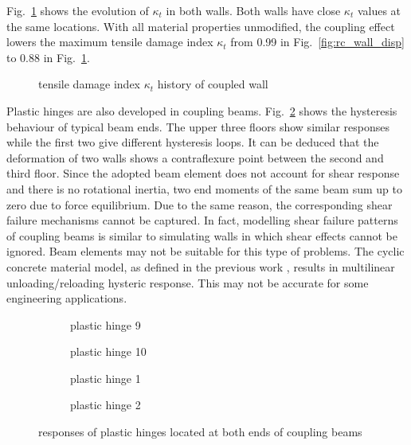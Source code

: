 \documentclass[3p,sort&compress,review,11pt,fleqn]{elsarticle}
\newcommand*{\figref}[1]{Fig.~\ref{#1}}
\begin{document}
\figref{fig:coupled_wall_kappat} shows the evolution of $\kappa_t$ in both walls. Both walls have close $\kappa_t$ values at the same locations. With all material properties unmodified, the coupling effect lowers the maximum tensile damage index $\kappa_t$ from \num{0.99} in \figref{fig:rc_wall_disp} to \num{0.88} in \figref{fig:coupled_wall_kappat}.
\begin{figure}[htb]
\centering\scriptsize

\caption{tensile damage index $\kappa_t$ history of coupled wall}\label{fig:coupled_wall_kappat}
\end{figure}

Plastic hinges are also developed in coupling beams. \figref{fig:coupled_wall_ph} shows the hysteresis behaviour of typical beam ends. The upper three floors show similar responses while the first two give different hysteresis loops. It can be deduced that the deformation of two walls shows a contraflexure point between the second and third floor. Since the adopted beam element does not account for shear response and there is no rotational inertia, two end moments of the same beam sum up to zero due to force equilibrium. Due to the same reason, the corresponding shear failure mechanisms cannot be captured. In fact, modelling shear failure patterns of coupling beams is similar to simulating walls in which shear effects cannot be ignored. Beam elements may not be suitable for this type of problems. The cyclic concrete material model, as defined in the previous work \citep{Chang2019}, results in multilinear unloading/reloading hysteric response. This may not be accurate for some engineering applications.
\begin{figure}[htbp]
\centering\scriptsize
\begin{subfigure}{.49\textwidth}\centering

\caption{plastic hinge 9}
\end{subfigure}\hfill
\begin{subfigure}{.49\textwidth}\centering

\caption{plastic hinge 10}
\end{subfigure}\vspace*{2mm}
\begin{subfigure}{.49\textwidth}\centering

\caption{plastic hinge 1}
\end{subfigure}\hfill
\begin{subfigure}{.49\textwidth}\centering

\caption{plastic hinge 2}
\end{subfigure}
\caption{responses of plastic hinges located at both ends of coupling beams}\label{fig:coupled_wall_ph}
\end{figure}
\end{document}
